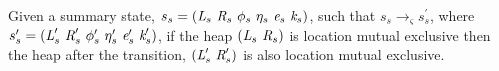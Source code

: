 \begin{theorem}
\label{thm:mutex}
Given a summary state, $s_s = ( \cfgnt{L}_s\ \cfgnt{R}_s\ \phi_s\ \eta_s\ \cfgnt{e}_s\ \cfgnt{k}_s )$, such that $s_s \rightarrow_\varsigma s_s^\prime$, where $s_s^\prime = ( \cfgnt{L}_s^\prime\ \cfgnt{R}_s^\prime\ \phi_s^\prime\ \eta_s^\prime\ \cfgnt{e}_s^\prime\ \cfgnt{k}_s^\prime )$, if the heap $(\emph{L}_s\ \emph{R}_s)$ is location mutual exclusive then the heap after the transition, $(\emph{L}_s^\prime\ \emph{R}_s^\prime)$ is also location mutual exclusive.
\begin{comment}
If we have a reachable summary state $s_s = ( \cfgnt{L}_s\ \cfgnt{R}_s\ \phi_s\ \eta_s\ \cfgnt{e}_s\ \cfgnt{k}_s )$, then for any reference $r \in \cfgnt{L}_s^\leftarrow$
$$ 
\begin{array}{l}
\forall (\phi_\alpha\ \cfgnt{l}_\alpha) \in \cfgnt{L}_s(\cfgnt{r})\ (\forall (\phi_\beta\ \cfgnt{l}_\beta) \in \cfgnt{L}_s(\cfgnt{r})\ ( \\
\ \ \ \ (\cfgnt{l}_\alpha \neq \cfgnt{l}_\beta) \Rightarrow ((\phi_\alpha \wedge \phi_\beta) = \cfgt{false})))
\end{array}
$$
\end{comment}
\end{theorem}
